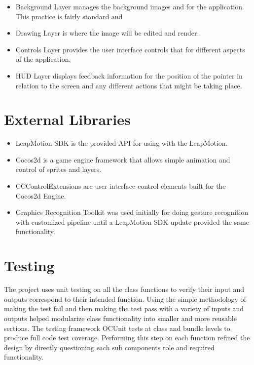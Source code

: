 \begin{itemize}
\item Background Layer manages the background images and for the application. This practice is fairly standard and 
\item Drawing Layer is where the image will be edited and render. 
\item Controls Layer provides the user interface controls that for different aspects of the application.
\item HUD Layer displays feedback information for the position of the pointer in relation to the screen and any different actions that might be taking place. 
\end{itemize}

\section{External Libraries}

\begin{itemize}
\item LeapMotion SDK is the provided API for using with the LeapMotion.\cite{leapmotion}
\item Cocos2d is a game engine framework that allows simple animation and control of sprites and layers. \cite{cocos2d}
\item CCControlExtensions are user interface control elements built for the Cocos2d Engine. \cite{cccontrolextension}
\item Graphics Recognition Toolkit was used initially for doing gesture recognition with customized pipeline until a LeapMotion SDK update provided the same functionality. \cite{GRT}

\end{itemize}

\section{Testing}

The project uses unit testing on all the class functions to verify their input and outputs correspond to their intended function. Using the simple methodology of making the test fail and then making the test pass with a variety of inputs and outputs helped modularize class functionality into smaller and more reusable sections. The testing framework OCUnit tests at class and bundle levels to produce full code test coverage. Performing this step on each function refined the design by directly questioning each sub components role and required functionality.\cite{appleapi}

